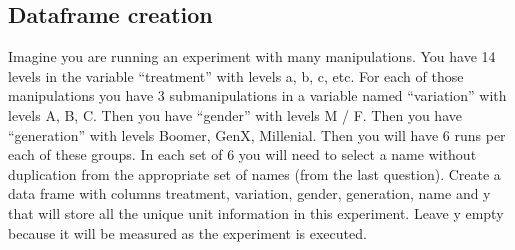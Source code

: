 \documentclass[
]{article}
\begin{document}
\hypertarget{dataframe-creation}{%
\subsection{Dataframe creation}\label{dataframe-creation}}

Imagine you are running an experiment with many manipulations. You have
14 levels in the variable ``treatment'' with levels a, b, c, etc. For
each of those manipulations you have 3 submanipulations in a variable
named ``variation'' with levels A, B, C. Then you have ``gender'' with
levels M / F. Then you have ``generation'' with levels Boomer, GenX,
Millenial. Then you will have 6 runs per each of these groups. In each
set of 6 you will need to select a name without duplication from the
appropriate set of names (from the last question). Create a data frame
with columns treatment, variation, gender, generation, name and y that
will store all the unique unit information in this experiment. Leave y
empty because it will be measured as the experiment is executed.
\end{document}
